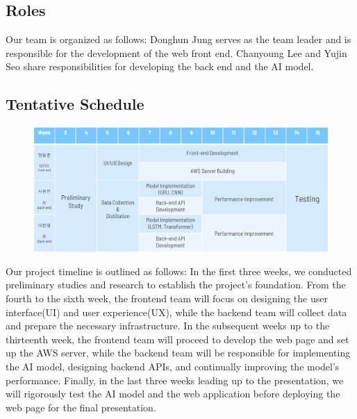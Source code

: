 \subsection{Roles}

Our team is organized as follows: 
Donghun Jung serves as the team leader and is responsible for the development of the web front end.
Chanyoung Lee and Yujin Seo share responsibilities for developing the back end and the AI model.

\subsection{Tentative Schedule}
\begin{figure}[h]
	\includegraphics[width=\textwidth]{Fig/Schedule.png}
\end{figure}
Our project timeline is outlined as follows: 
In the first three weeks, we conducted preliminary studies and research to establish the project's foundation. 
From the fourth to the sixth week, the frontend team will focus on designing the user interface(UI) and user experience(UX), 
while the backend team will collect data and prepare the necessary infrastructure. 
In the subsequent weeks up to the thirteenth week, the frontend team will proceed to develop the web page and set up the AWS server, 
while the backend team will be responsible for implementing the AI model, designing backend APIs, and continually improving the model's performance. 
Finally, in the last three weeks leading up to the presentation, we will rigorously test the AI model and the web application before deploying the web page for the final presentation.